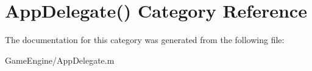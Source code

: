 \hypertarget{category_app_delegate_07_08}{}\section{App\+Delegate() Category Reference}
\label{category_app_delegate_07_08}


The documentation for this category was generated from the following file\+:\begin{DoxyCompactItemize}
\item 
Game\+Engine/App\+Delegate.\+m\end{DoxyCompactItemize}

